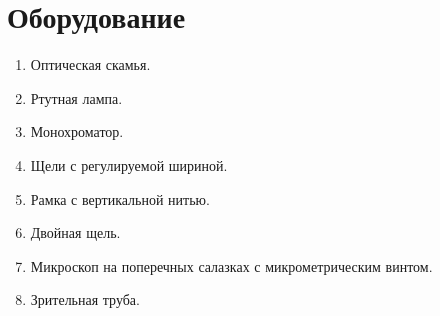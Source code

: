 \section*{Оборудование}

\begin{enumerate}
	\item Оптическая скамья.
	
	\item Ртутная лампа.
	
	\item Монохроматор.
	
	\item Щели с регулируемой шириной.
	
	\item Рамка с вертикальной нитью.
	
	\item Двойная щель.
	
	\item Микроскоп на поперечных салазках с микрометрическим винтом.
	
	\item Зрительная труба.
\end{enumerate}